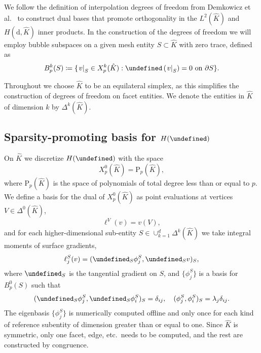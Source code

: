 \documentclass[review,onefignum,onetabnum,a4paper]{siamart190516}
\let\grad\undefined
\let\tr\undefined
\DeclareMathOperator{\grad}{grad}
\DeclareMathOperator{\tr}{tr}
\newcommand{\Hgrad}{H(\grad)}
\newcommand{\Ltwo}{L^2}
\newcommand{\Khat}{\hat{K}}
\renewcommand{\P}{\mathrm{P}}
\begin{document}
We follow the definition of interpolation degrees of freedom from
Demkowicz et al.~\cite{demkowicz00} to construct dual bases that promote orthogonality in the
$\Ltwo(\Khat)$ and $H(\mathrm{d}, \Khat)$ inner products.
In the construction of the degrees of freedom we will employ bubble subspaces on a given mesh entity $S \subset \Khat$ with zero trace, defined as
\begin{equation}
B^k_p(S) \coloneqq \{\left.v\right|_S \in X^k_p(\Khat): \tr \left(\left.v\right|_S\right) = 0 \text{ on } \partial S\}.
\end{equation}

Throughout we choose $\Khat$ to be an equilateral simplex, as this simplifies the construction of degrees of freedom on facet entities.
We denote the entities in $\Khat$ of dimension $k$ by $\Delta^k(\Khat)$.

\subsection{Sparsity-promoting basis for $\Hgrad$}

On $\Khat$ we discretize $\Hgrad$ with the space
\begin{equation}
X^0_{p}(\Khat) = \P_p(\Khat),
\end{equation}
where $\P_p(\Khat)$ is the space of polynomials of total degree less than or equal to $p$.
We define a basis for the dual of $X^0_p(\Khat)$ as
point evaluations at vertices $V \in \Delta^0(\Khat)$,
\begin{equation}
   \ell^V(v) = v(V),
\end{equation}
and for each higher-dimensional sub-entity $S \in \cup_{k=1}^d \Delta^k(\Khat)$
we take integral moments of surface gradients, 
\begin{equation}
   \ell^S_j(v) = (\grad_S\phi^S_j, \grad_S v)_{S},
\end{equation}
where $\grad_S$ is the tangential gradient on $S$,
and $\{\phi^S_j\}$ is a basis for $B^0_p(S)$
such that
\begin{equation} \label{eq:hgrad-fdm}
   (\grad_S\phi^S_j, \grad_S\phi^S_i)_{S} = \delta_{ij}, \quad
   (\phi^S_j, \phi^S_i)_{S} = \lambda_j\delta_{ij}.
\end{equation}
The eigenbasis $\{\phi^S_j\}$ is numerically computed offline and only once
for each kind of reference subentity of dimension greater than or equal to one. Since $\Khat$ is symmetric, only one facet, edge, etc.~needs to be computed, and the rest are constructed by congruence.
\end{document}
